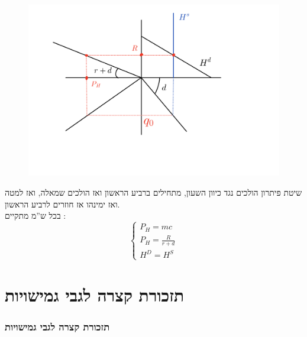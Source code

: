 \documentclass[usenames,dvipsnames]{beamer}
\begin{document}
\begin{RTL}
\begin{frame}[allowframebreaks]
\framebreak
\begin{figure}
    \begin{small}
        \begin{center}
            \includegraphics[width=1.2\textwidth]{figures/SCR-20231209-nblm.png}
        \end{center}
    \end{small}
\end{figure}


\framebreak
\begin{block}{שיטת פיתרון}
    הולכים נגד כיוון השעון, מתחילים ברביע הראשון ואז הולכים שמאלה, ואז למטה ואז ימינהו אז חוזרים לרביע הראשון.
    \\
    בכל ש''מ מתקיים :
    $$\begin{cases}
        P_H = mc \\ 
        P_H = \frac{R}{r+d}\\ 
        H^D = H^S
    \end{cases}$$
\end{block}
\end{frame}



\section{תזכורת קצרה לגבי גמישויות}
\begin{frame}[allowframebreaks]
    \frametitle{תזכורת קצרה לגבי גמישויות}

    

\end{frame}
\end{RTL}
\end{document}
